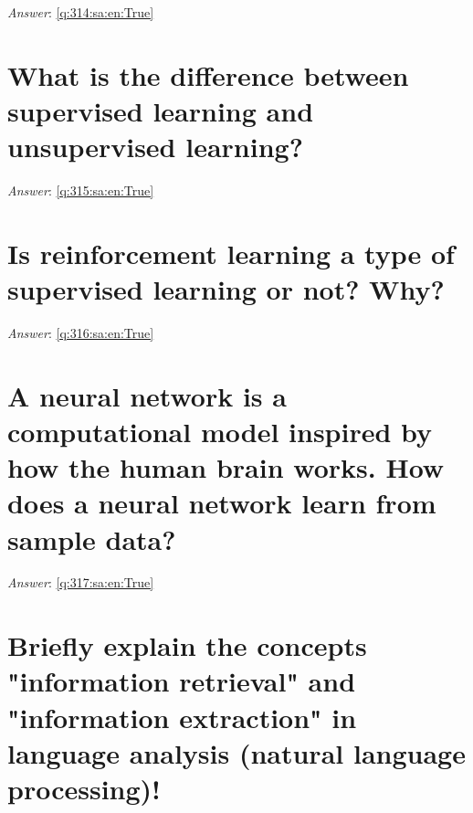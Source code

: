 \documentclass[a4paper,11pt,oneside]{book}
\begin{document}
\begin{sloppypar}
\textit{Answer}: \autoref{q:314:sa:en:True}



\section{What is the difference between supervised learning and unsupervised learning?}

\label{q:315:sa:en:False}

\vspace{2cm}

\noindent\makebox[\textwidth]{\hrulefill}

\vspace{1cm}

\textit{Answer}: \autoref{q:315:sa:en:True}



\section{Is reinforcement learning a type of supervised learning or not? Why?}

\label{q:316:sa:en:False}

\vspace{2cm}

\noindent\makebox[\textwidth]{\hrulefill}

\vspace{1cm}

\textit{Answer}: \autoref{q:316:sa:en:True}



\section{A neural network is a computational model inspired by how the human brain works. How does a neural network learn from sample data?}

\label{q:317:sa:en:False}

\vspace{2cm}

\noindent\makebox[\textwidth]{\hrulefill}

\vspace{1cm}

\textit{Answer}: \autoref{q:317:sa:en:True}



\section{Briefly explain the concepts "information retrieval" and "information extraction" in language analysis (natural language processing)!}


\end{sloppypar}
\end{document}
